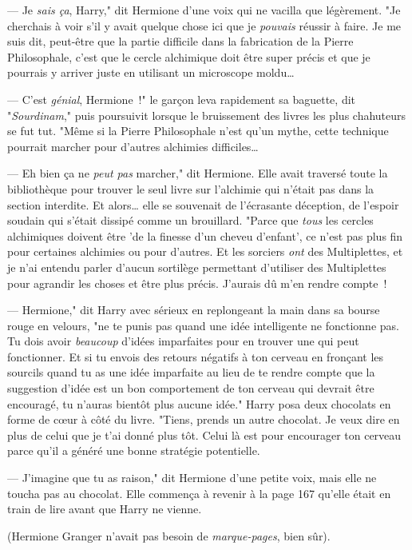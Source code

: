 --- Je \emph{sais ça}, Harry," dit Hermione d'une voix qui ne vacilla que légèrement. "Je cherchais à voir s'il y avait quelque chose ici que je \emph{pouvais} réussir à faire. Je me suis dit, peut-être que la partie difficile dans la fabrication de la Pierre Philosophale, c'est que le cercle alchimique doit être super précis et que je pourrais y arriver juste en utilisant un microscope moldu…

--- C'est \emph{génial}, Hermione~!" le garçon leva rapidement sa baguette, dit "\emph{Sourdinam}," puis poursuivit lorsque le bruissement des livres les plus chahuteurs se fut tut. "Même si la Pierre Philosophale n'est qu'un mythe, cette technique pourrait marcher pour d'autres alchimies difficiles…

--- Eh bien ça ne \emph{peut pas} marcher," dit Hermione. Elle avait traversé toute la bibliothèque pour trouver le seul livre sur l'alchimie qui n'était pas dans la section interdite. Et alors… elle se souvenait de l'écrasante déception, de l'espoir soudain qui s'était dissipé comme un brouillard. "Parce que \emph{tous} les cercles alchimiques doivent être 'de la finesse d'un cheveu d'enfant', ce n'est pas plus fin pour certaines alchimies ou pour d'autres. Et les sorciers \emph{ont} des Multiplettes, et je n'ai entendu parler d'aucun sortilège permettant d'utiliser des Multiplettes pour agrandir les choses et être plus précis. J'aurais dû m'en rendre compte~!

--- Hermione," dit Harry avec sérieux en replongeant la main dans sa bourse rouge en velours, "ne te punis pas quand une idée intelligente ne fonctionne pas. Tu dois avoir \emph{beaucoup} d'idées imparfaites pour en trouver une qui peut fonctionner. Et si tu envois des retours négatifs à ton cerveau en fronçant les sourcils quand tu as une idée imparfaite au lieu de te rendre compte que la suggestion d'idée est un bon comportement de ton cerveau qui devrait être encouragé, tu n'auras bientôt plus aucune idée." Harry posa deux chocolats en forme de cœur à côté du livre. "Tiens, prends un autre chocolat. Je veux dire en plus de celui que je t'ai donné plus tôt. Celui là est pour encourager ton cerveau parce qu'il a généré une bonne stratégie potentielle.

--- J'imagine que tu as raison," dit Hermione d'une petite voix, mais elle ne toucha pas au chocolat. Elle commença à revenir à la page 167 qu'elle était en train de lire avant que Harry ne vienne.

(Hermione Granger n'avait pas besoin de \emph{marque-pages}, bien sûr).

